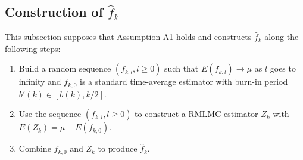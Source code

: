 \documentclass[a4paper,11pt]{article}
\begin{document}
\subsection{Construction  of    \(\hat f_{k}\)  }\label{sub:unbiasedLongRun}
This subsection supposes that Assumption A1 holds and constructs     \(\hat f_{k}\) along the following steps:\begin{enumerate}
\item 
Build a random sequence \((f_{k,l},l\geq0)\) such that \(E(f_{k,l})\rightarrow\mu\) as \(l\) goes to infinity and  \(f_{k,0}\) is a standard time-average estimator with burn-in period   \(b'(k)\in[b(k),k/2]\).
\item Use the sequence  \((f_{k,l},l\geq0)\) to construct a RMLMC estimator \(Z_{k}\) with \(E(Z_{k})=\mu-E(f_{k,0})\).
\item Combine \(f_{k,0}\) and  \(Z_{k}\)  to produce  \(\hat f_{k}\).
\end{enumerate}
  

  
 
\end{document}
